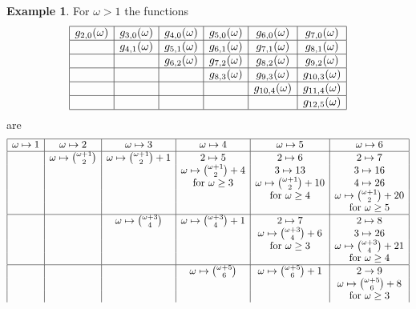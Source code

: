 \documentclass{article}
\theoremstyle{plain}
\theoremstyle{definition}
\newtheorem{exa}{Example}
\begin{document}
\begin{exa}  For $\omega > 1$ the functions 
 \[\begin{array}{|c|c|c|c|c|c|}
 \hline
 g_{2,0}(\omega) & g_{3,0}(\omega) & g_{4,0}(\omega) & g_{5,0}(\omega) & g_{6,0}(\omega) & g_{7,0}(\omega) \\
 \hline & g_{4,1}(\omega)& g_{5,1}(\omega)  & g_{6,1}(\omega)  & g_{7,1}(\omega) & g_{8,1}(\omega)  \\
  \hline && g_{6,2}(\omega)& g_{7,2}(\omega)  & g_{8,2}(\omega)  & g_{9,2}(\omega) \\
   \hline &&& g_{8,3}(\omega)  & g_{9,3}(\omega)  & g_{10,3}(\omega) \\
    \hline &&&& g_{10,4}(\omega)  & g_{11,4}(\omega) \\
     \hline &&&&& g_{12,5}(\omega) \\
 \hline
 \end{array} \]
 are
 \[\begin{array}{|c|c|c|c|c|c|}
 \hline
 \omega \mapsto 1 &  \omega \mapsto 2 &  \omega \mapsto 3& \omega \mapsto 4 &  \omega \mapsto 5 &  \omega \mapsto 6  \\
 \hline &  \omega \mapsto {\omega+1 \choose 2}  &  \omega \mapsto {\omega+1 \choose 2}+1 &  2 \mapsto 5  & 2 \mapsto 6 & 2 \mapsto 7 \\
 &   &  &  \omega \mapsto {\omega+1 \choose 2}+4  & 3 \mapsto 13& 3 \mapsto 16  \\
 &   &  &  \textrm{for $\omega \geq 3$}  &  \omega \mapsto {\omega+1 \choose 2}+10 & 4 \mapsto 26  \\
  &   &  & &   \textrm{for $\omega \geq 4$}  &  \omega \mapsto {\omega+1 \choose 2}+20  \\
   &   &  & & &   \textrm{for $\omega \geq 5 $}    \\
  \hline && \omega \mapsto {\omega+3 \choose 4} & \omega \mapsto {\omega+3 \choose 4}+1  & 2 \mapsto 7 & 2 \mapsto 8 \\
    &&&  & \omega \mapsto {\omega+3 \choose 4}+6  & 3 \mapsto 26  \\
     &&&  & \textrm{for $\omega \geq 3 $} &  \omega \mapsto {\omega+3 \choose 4}+21    \\
      &&&&  & \textrm{for $\omega \geq 4 $}   \\
   \hline &&&  \omega \mapsto {\omega+5 \choose 6}  & \omega \mapsto {\omega+5 \choose 6} +1   & 2\rightarrow 9   \\
   &&&   &  &  \omega \mapsto {\omega+5 \choose 6} + 8 \\
    &&&&  & \textrm{for $\omega \geq 3 $}   \\

\end{array}\]
\end{exa}
\end{document}
